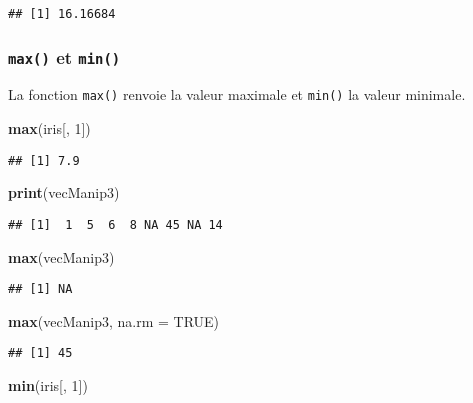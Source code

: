 \documentclass[]{book}
\newenvironment{Shaded}{\begin{snugshade}}{\end{snugshade}}
\newcommand{\KeywordTok}[1]{\textcolor[rgb]{0.13,0.29,0.53}{\textbf{#1}}}
\newcommand{\DataTypeTok}[1]{\textcolor[rgb]{0.13,0.29,0.53}{#1}}
\newcommand{\DecValTok}[1]{\textcolor[rgb]{0.00,0.00,0.81}{#1}}
\newcommand{\OtherTok}[1]{\textcolor[rgb]{0.56,0.35,0.01}{#1}}
\newcommand{\NormalTok}[1]{#1}
\theoremstyle{definition}
\theoremstyle{definition}
\theoremstyle{definition}
\theoremstyle{remark}
\begin{document}
\begin{verbatim}
## [1] 16.16684
\end{verbatim}

\subsubsection{\texorpdfstring{\texttt{max()} et
\texttt{min()}}{max() et min()}}\label{l015max}

La fonction \texttt{max()} renvoie la valeur maximale et \texttt{min()}
la valeur minimale.

\begin{Shaded}
\begin{Highlighting}[]
\KeywordTok{max}\NormalTok{(iris[, }\DecValTok{1}\NormalTok{])}
\end{Highlighting}
\end{Shaded}

\begin{verbatim}
## [1] 7.9
\end{verbatim}

\begin{Shaded}
\begin{Highlighting}[]
\KeywordTok{print}\NormalTok{(vecManip3)}
\end{Highlighting}
\end{Shaded}

\begin{verbatim}
## [1]  1  5  6  8 NA 45 NA 14
\end{verbatim}

\begin{Shaded}
\begin{Highlighting}[]
\KeywordTok{max}\NormalTok{(vecManip3)}
\end{Highlighting}
\end{Shaded}

\begin{verbatim}
## [1] NA
\end{verbatim}

\begin{Shaded}
\begin{Highlighting}[]
\KeywordTok{max}\NormalTok{(vecManip3, }\DataTypeTok{na.rm =} \OtherTok{TRUE}\NormalTok{)}
\end{Highlighting}
\end{Shaded}

\begin{verbatim}
## [1] 45
\end{verbatim}

\begin{Shaded}
\begin{Highlighting}[]
\KeywordTok{min}\NormalTok{(iris[, }\DecValTok{1}\NormalTok{])}
\end{Highlighting}
\end{Shaded}
\end{document}
